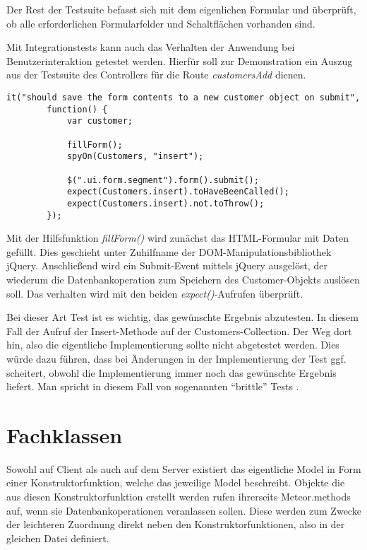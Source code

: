 Der Rest der Testsuite befasst sich mit dem eigenlichen Formular und überprüft,
ob alle erforderlichen Formularfelder und Schaltflächen vorhanden sind.

Mit Integrationstests kann auch das Verhalten der Anwendung bei Benutzerinteraktion
getestet werden. Hierfür soll zur Demonstration ein Auszug aus der Testsuite des
Controllers für die Route \textit{customersAdd} dienen.

\begin{lstlisting}[caption=Test des Verhaltens bei Benutzereingabe]
  it("should save the form contents to a new customer object on submit",
		function() {
			var customer;

			fillForm();
			spyOn(Customers, "insert");

			$(".ui.form.segment").form().submit();
			expect(Customers.insert).toHaveBeenCalled();
			expect(Customers.insert).not.toThrow();
		});
\end{lstlisting}

Mit der Hilfsfunktion \textit{fillForm()} wird zunächst das HTML-Formular mit
Daten gefüllt. Dies geschieht unter Zuhilfname der DOM-Manipulationsbibliothek
jQuery. Anschließend wird ein Submit-Event mittels jQuery ausgelöst, der
wiederum die Datenbankoperation zum Speichern des Customer-Objekts auslösen
soll. Das verhalten wird mit den beiden \textit{expect()}-Aufrufen überprüft.

Bei dieser Art Test ist es wichtig, das gewünschte Ergebnis abzutesten. In
diesem Fall der Aufruf der Insert-Methode auf der Customers-Collection. Der Weg
dort hin, also die eigentliche Implementierung sollte nicht abgetestet werden.
Dies würde dazu führen, dass bei Änderungen in der Implementierung der Test ggf.
scheitert, obwohl die Implementierung immer noch das gewünschte Ergebnis
liefert. Man spricht in diesem Fall von sogenannten "`brittle"' Tests
\cite{brittle-tests}.

\section{Fachklassen}

Sowohl auf Client als auch auf dem Server existiert das eigentliche Model in
Form einer Konstruktorfunktion, welche das jeweilige Model beschreibt. Objekte
die aus diesen Konstruktorfunktion erstellt werden rufen ihrerseits
Meteor.methods auf, wenn sie Datenbankoperationen veranlassen sollen. Diese
werden zum Zwecke der leichteren Zuordnung direkt neben den
Konstruktorfunktionen, also in der gleichen Datei definiert.


